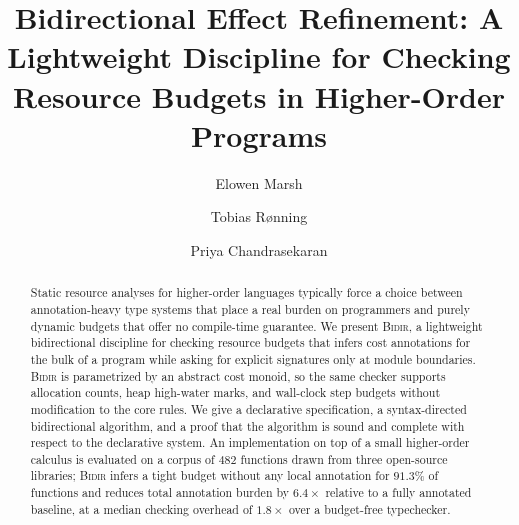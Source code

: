 \documentclass[acmsmall,screen,review,anonymous]{acmart}
\begin{document}
\title{Bidirectional Effect Refinement: A Lightweight Discipline for Checking Resource
Budgets in Higher-Order Programs}

\author{Elowen Marsh}

\author{Tobias R\o{}nning}

\author{Priya Chandrasekaran}

\renewcommand{\shortauthors}{Marsh et al.}

\begin{abstract}
Static resource analyses for higher-order languages typically force a choice between
annotation-heavy type systems that place a real burden on programmers and purely dynamic
budgets that offer no compile-time guarantee. We present \textsc{Bidir}, a lightweight
bidirectional discipline for checking resource budgets that infers cost annotations for the
bulk of a program while asking for explicit signatures only at module boundaries.
\textsc{Bidir} is parametrized by an abstract cost monoid, so the same checker supports
allocation counts, heap high-water marks, and wall-clock step budgets without modification
to the core rules. We give a declarative specification, a syntax-directed bidirectional
algorithm, and a proof that the algorithm is sound and complete with respect to the
declarative system. An implementation on top of a small higher-order calculus is evaluated
on a corpus of $482$ functions drawn from three open-source libraries; \textsc{Bidir} infers
a tight budget without any local annotation for $91.3\%$ of functions and reduces total
annotation burden by $6.4\times$ relative to a fully annotated baseline, at a median checking
overhead of $1.8\times$ over a budget-free typechecker.
\end{abstract}

\end{document}
